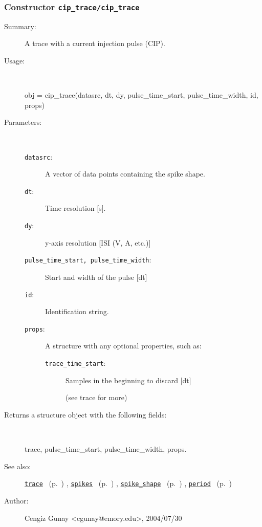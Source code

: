 \subsubsection[Constructor \texttt{cip\_trace}]{Constructor \texttt{cip\_trace/cip\_trace}}%
%
\label{ref_cip_trace__cip_trace}%
\hypertarget{ref_cip_trace__cip_trace}{}%
\begin{description}
\item[Summary:]A trace with a current injection pulse (CIP).
%
\item[Usage:]~%
\begin{lyxcode}%
obj = cip\_trace(datasrc, dt, dy,
		  pulse\_time\_start, pulse\_time\_width, id, props)
%
\end{lyxcode}%
%
%
\item[Parameters:]~
\begin{description}%
\item[\texttt{datasrc}:]
 A vector of data points containing the spike shape.
\item[\texttt{dt}:]
 Time resolution [s].
\item[\texttt{dy}:]
 y-axis resolution [ISI (V, A, etc.)]
\item[\texttt{pulse\_time\_start, pulse\_time\_width}:]


Start and width of the pulse [dt]\item[\texttt{id}:]
 Identification string.
\item[\texttt{props}:]
 A structure with any optional properties, such as:
\begin{description}%
\item[\texttt{trace\_time\_start}:]
 Samples in the beginning to discard [dt]

(see trace for more)\end{description}%
\end{description}%
%
\item[Returns a structure object with the following fields:]~

	trace, pulse\_time\_start, pulse\_time\_width, props.
%
%
\item[See also:]%
\hyperlink{ref_trace}{\texttt{trace}}%
\ (p.~\pageref{ref_trace})%
%
, \hyperlink{ref_spikes}{\texttt{spikes}}%
\ (p.~\pageref{ref_spikes})%
%
, \hyperlink{ref_spike_shape}{\texttt{spike\_shape}}%
\ (p.~\pageref{ref_spike_shape})%
%
, \hyperlink{ref_period}{\texttt{period}}%
\ (p.~\pageref{ref_period})%
%
%
\item[Author:]%
Cengiz Gunay <cgunay@emory.edu>, 2004/07/30%
\end{description}
\methodline%
